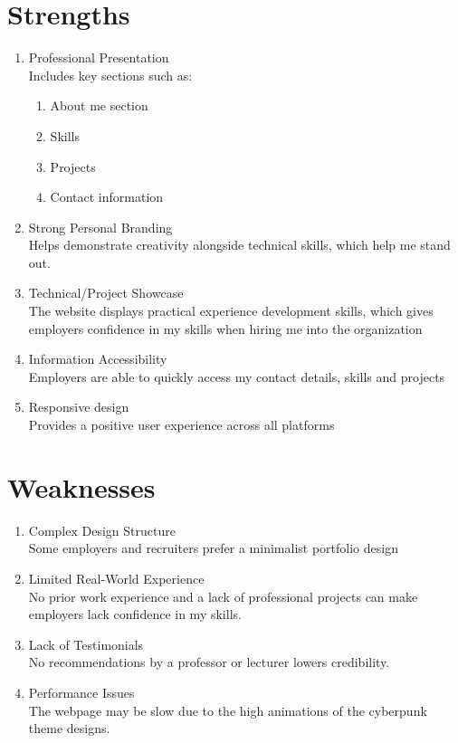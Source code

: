 \documentclass[12pt,a4paper,oneside]{report}
\begin{document}
\section{Strengths}
\begin{enumerate}
 \item Professional Presentation\\
 Includes key sections such as: \begin{enumerate}
     \item About me section
     \item  Skills
     \item Projects
     \item Contact information
 \end{enumerate}
 \item Strong Personal Branding\\
 Helps demonstrate creativity alongside technical skills, which help me stand out.
 \item Technical/Project Showcase\\
 The website displays practical experience development skills, which gives employers confidence in my skills when hiring me into the organization
 \item Information Accessibility\\
 Employers are able to quickly access my contact details, skills and projects
 \item Responsive design\\
 Provides a positive user experience across all platforms
 
\end{enumerate}


\newpage
\section{Weaknesses}
\begin{enumerate}
    \item Complex Design Structure\\
    Some employers and recruiters prefer a minimalist portfolio design
    \item  Limited Real-World Experience\\
    No prior work experience and a lack of professional projects can make employers lack confidence in my skills.
    \item Lack of Testimonials\\ 
    No recommendations by a professor or lecturer lowers credibility.
    \item Performance Issues\\
    The webpage may be slow due to the high animations of the cyberpunk theme designs.
    
\end{enumerate}
\end{document}
